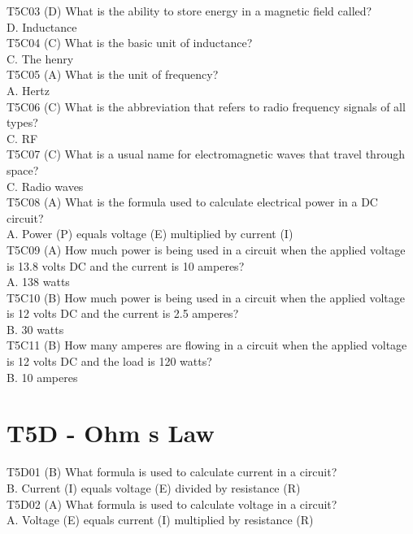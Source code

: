 \documentclass[12pt,letterpaper]{report}
\begin{document}
T5C03 (D) What is the ability to store energy in a magnetic field called?\\
D. Inductance\\

T5C04 (C) What is the basic unit of inductance?\\
C. The henry\\

T5C05 (A) What is the unit of frequency?\\
A. Hertz\\

T5C06 (C) What is the abbreviation that refers to radio frequency signals of all types?\\
C. RF\\

T5C07 (C) What is a usual name for electromagnetic waves that travel through space?\\
C. Radio waves\\

T5C08 (A) What is the formula used to calculate electrical power in a DC circuit?\\
A. Power (P) equals voltage (E) multiplied by current (I)\\

T5C09 (A) How much power is being used in a circuit when the applied voltage is 13.8 volts DC and the current is 10 amperes?\\
A. 138 watts\\

T5C10 (B) How much power is being used in a circuit when the applied voltage is 12 volts DC and the current is 2.5 amperes?\\
B. 30 watts\\

T5C11 (B) How many amperes are flowing in a circuit when the applied voltage is 12 volts DC and the load is 120 watts?\\
B. 10 amperes\\

\section{T5D - Ohm s Law}

T5D01 (B) What formula is used to calculate current in a circuit?\\
B. Current (I) equals voltage (E) divided by resistance (R)\\

T5D02 (A) What formula is used to calculate voltage in a circuit?\\
A. Voltage (E) equals current (I) multiplied by resistance (R)\\
\end{document}
